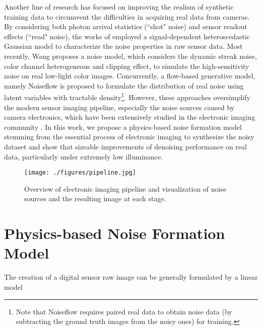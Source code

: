 \documentclass[10pt,twocolumn,letterpaper]{article}
\begin{document}
Another line of research has focused on improving the realism of synthetic
training data to circumvent the difficulties in acquiring real data from
cameras. By considering both photon arrival statistics (``shot" noise) and sensor
readout effects (``read" noise), the works of \cite{Mildenhall_2018_CVPR,Brooks2018Unprocessing} employed a signal-dependent heteroscedastic Gaussian
model \cite{Foi2008Practical} to characterize the noise properties in raw sensor
data. Most recently, Wang \etal \cite{Wang_2019_ICCV} proposes a noise model, which considers the dynamic streak noise, color channel heterogeneous and clipping effect, to simulate the high-sensitivity noise on real low-light color images.  Concurrently, a flow-based generative model, namely Noiseflow \cite{Abdelhamed_2019_ICCV} is proposed to formulate the distribution of real noise using latent variables with tractable density\footnote{Note that Noiseflow requires paired real data to obtain noise data (by subtracting the ground truth images from the noisy ones) for training.}. 
However, these approaches oversimplify the modern
sensor imaging pipeline, especially the noise sources caused by camera
electronics, which have been extensively studied in the electronic
imaging community \cite{Mikhail2014Highlevel,Healey1994Radiometric,Gow2007A,Baer2006A,El2005CMOS,Farrell2008Sensor,Irie2008A,Irie2008A2,Boie1992An,Wach2004Noise,Costantini2004Virtual}. 
In this work, we propose a
physics-based noise formation model stemming from the essential process of
electronic imaging to synthesize the noisy dataset and show that sizeable improvements of denoising
performance on real data, particularly under extremely low illuminance.



\begin{figure}[!t]
\centering
\texttt{[image: ./figures/pipeline.jpg]}
\caption{Overview of electronic imaging pipeline and visualization of noise sources and the resulting image at each stage. }
\label{fig:photosensor}
\end{figure}



\section{Physics-based Noise Formation Model} \label{sec:noise-model}
The creation of a digital sensor raw image  can be generally formulated by a
linear model
  
\end{document}
